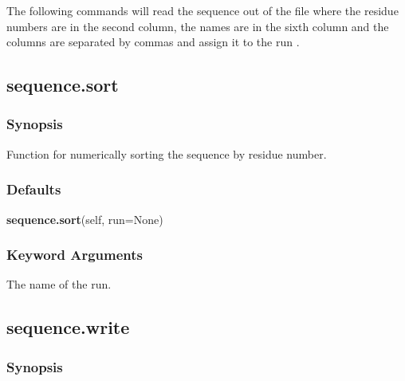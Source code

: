
 The following commands will read the sequence out of the file  where the residue numbers are in the second column, the names are in the sixth column and the columns are separated by commas and assign it to the run . 
  



  

 \newpage 

 \subsection{sequence.sort} 

  
 \subsubsection{Synopsis} 

 Function for numerically sorting the sequence by residue number. 
  

  
 \subsubsection{Defaults} 

 \textsf{\textbf{sequence.sort}(self, run=None)} 

  
 \subsubsection{Keyword Arguments} 

   The name of the run.  

  

  

 \newpage 

 \subsection{sequence.write} 

  
 \subsubsection{Synopsis} 

